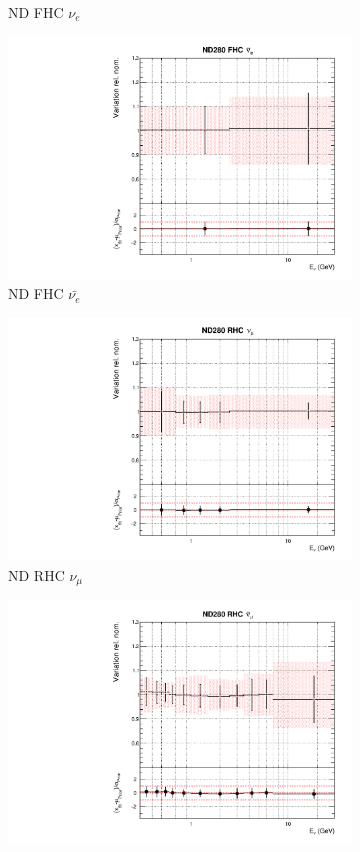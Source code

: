 \begin{figure}
\begin{subfigure}{0.45\textwidth}
  \caption{ND FHC $\nu_e$}
\end{subfigure}
\begin{subfigure}{0.45\textwidth}
  \centering
  \includegraphics[width=0.75\linewidth]{figs/asmvflux3}
  \caption{ND FHC $\bar{\nu_{e}}$}
\end{subfigure}
\begin{subfigure}{0.45\textwidth}
  \centering
  \includegraphics[width=0.75\linewidth]{figs/asmvflux4}
  \caption{ND RHC $\nu_{\mu}$}
\end{subfigure}
\begin{subfigure}{0.45\textwidth}
  \centering
  \includegraphics[width=0.75\linewidth]{figs/asmvflux5}

\end{subfigure}
\end{figure}
